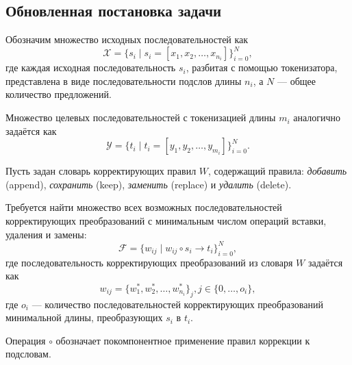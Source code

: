 \subsection{Обновленная постановка задачи}

Обозначим множество исходных последовательностей как
\[
\mathcal{X} = \{s_i \mid s_i = [x_1, x_2, \ldots, x_{n_i}]\}_{i = 0}^N,
\]
где каждая исходная последовательность $s_i$, разбитая с помощью токенизатора, представлена в виде последовательности подслов длины $n_i$, а $N$ — общее количество предложений.

Множество целевых последовательностей с токенизацией длины $m_i$ аналогично задаётся как
\[
\mathcal{Y} = \{t_i \mid t_i = [y_1, y_2, \ldots, y_{m_i}]\}_{i = 0}^N.
\]

Пусть задан словарь корректирующих правил $W$, содержащий правила: \textit{добавить} (append), \textit{сохранить} (keep), \textit{заменить} (replace) и \textit{удалить} (delete).

Требуется найти множество всех возможных последовательностей корректирующих преобразований с минимальным числом операций вставки, удаления и замены:
\[
\mathcal{F} = \{ w_{ij} \mid w_{ij} \circ s_i \rightarrow t_i \}_{i = 0}^N,
\]
где последовательность корректирующих преобразований из словаря $W$ задаётся как
\[
w_{ij} = \{w_1^*, w_2^*, \ldots, w_{n_i}^*\}_{j}, j \in \{0, \ldots, o_i\},
\]
где $o_i$ — количество последовательностей корректирующих преобразований минимальной длины, преобразующих $s_i$ в $t_i$.

Операция $\circ$ обозначает покомпонентное применение правил коррекции к подсловам.
